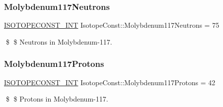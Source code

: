 \subsubsection{\texorpdfstring{Molybdenum117\+Neutrons}{Molybdenum117Neutrons}}
{\footnotesize\ttfamily \mbox{\hyperlink{group___isotope_const-_macros_ga5f18360b3e99483a35c32d789e62621c}{I\+S\+O\+T\+O\+P\+E\+C\+O\+N\+S\+T\+\_\+\+I\+NT}} Isotope\+Const\+::\+Molybdenum117\+Neutrons = 75}

\$ \$ Neutrons in Molybdenum-\/117. \mbox{\label{group___isotope_const-_molybdenum-_mo117_ga4c466a2f6dbbb34e12d4c07dbd978480}} 
\subsubsection{\texorpdfstring{Molybdenum117\+Protons}{Molybdenum117Protons}}
{\footnotesize\ttfamily \mbox{\hyperlink{group___isotope_const-_macros_ga5f18360b3e99483a35c32d789e62621c}{I\+S\+O\+T\+O\+P\+E\+C\+O\+N\+S\+T\+\_\+\+I\+NT}} Isotope\+Const\+::\+Molybdenum117\+Protons = 42}

\$ \$ Protons in Molybdenum-\/117. 
